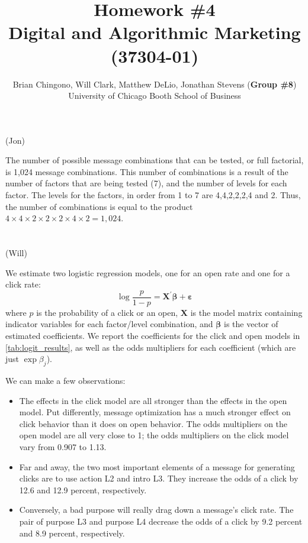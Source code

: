 



\title{Homework \#4\\
Digital and Algorithmic Marketing (37304-01)}
\author{
Brian Chingono, Will Clark, Matthew DeLio, Jonathan Stevens (\textbf{Group \#8})\\
University of Chicago Booth School of Business}

\maketitle

\section{} (Jon) %

The number of possible message combinations that can be tested, or full factorial, is 1,024 message combinations. This number of combinations is a result of the number of factors that are being tested (7), and the number of levels for each factor.  The levels for the factors, in order from 1 to 7 are 4,4,2,2,2,4 and 2.  Thus, the number of combinations is equal to the product $4\times4\times2\times2\times2\times4\times2 = 1,024$.    

\section{} (Will) %

We estimate two logistic regression models, one for an open rate and one for a click rate:
\[ \log{\frac{p}{1-p}} = \bm{X}^{\prime} \bm{\beta} + \bm{\varepsilon} \]
where $p$ is the probability of a click or an open, $\bm{X}$ is the model matrix containing indicator variables for each factor/level combination, and $\bm{\beta}$ is the vector of estimated coefficients. We report the coefficients for the click and open models in \cref{tab:logit_results}, as well as the odds multipliers for each coefficient (which are just $\exp{\beta_j}$).

We can make a few observations:
\begin{itemize}
\item The effects in the click model are all stronger than the effects in the open model. Put differently, message optimization has a much stronger effect on click behavior than it does on open behavior. The odds multipliers on the open model are all very close to 1; the odds multipliers on the click model vary from 0.907 to 1.13.
\item Far and away, the two most important elements of a message for generating clicks are to use \textsf{action L2} and \textsf{intro L3}. They increase the odds of a click by 12.6 and 12.9 percent, respectively.
\item Conversely, a bad \textsf{purpose} will really drag down a message's click rate. The pair of \textsf{purpose L3} and \textsf{purpose L4} decrease the odds of a click by 9.2 percent and 8.9 percent, respectively.
\end{itemize}

